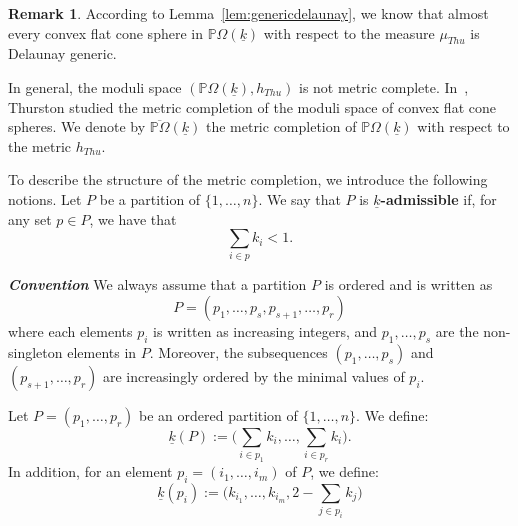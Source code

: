 \documentclass{compositio}
\numberwithin{equation}{section}
\numberwithin{figure}{section}
\theoremstyle{definition}
\newtheorem{remark}[definition]{Remark}
\theoremstyle{plain}
\begin{document}
{\begin{remark}
According to Lemma~\ref{lem:genericdelaunay}, we know that almost every convex flat cone sphere in $\mathbb{P}\Omega(\underline{k})$ with respect to the measure $\mu_{Thu}$ is Delaunay generic.
\end{remark}

In general, the moduli space $(\mathbb{P}\Omega(\underline{k}),h_{Thu})$ is not metric complete. In~\cite{thu}, Thurston studied the metric completion of the moduli space of convex flat cone spheres. We denote by $\overline{\mathbb{P}\Omega}(\underline{k})$ the metric completion of $\mathbb{P}\Omega(\underline{k})$ with respect to the metric $h_{Thu}$.


To describe the structure of the metric completion, we introduce the following notions. Let $P$ be a partition of $\{1,\ldots,n\}$. We say that $P$ is \textbf{$\underline{k}$-admissible} if, for any set $p \in P$, we have that
$$
\sum_{i\in p}k_i<1.
$$

\noindent\textit{\textbf{Convention}} We always assume that a partition $P$ is ordered and is written as 
$$P = (p_1, \ldots, p_s, p_{s+1},\ldots, p_r)$$ 
where each elements $p_i$ is written as increasing integers, and $p_1, \ldots, p_s$ are the non-singleton elements in $P$. Moreover, the subsequences $(p_1, \ldots, p_s)$ and $(p_{s+1}, \ldots, p_r)$ are increasingly ordered by the minimal values of $p_i$.\newline


Let $P = (p_1, \ldots, p_r)$ be an ordered partition of $\{1,\ldots,n\}$. We define:
\begin{equation}\label{equ:curvaturenotations0}
    \underline{k}(P) := \Big(\sum_{i \in p_1} k_i, \ldots, \sum_{i \in p_r} k_i \Big).
\end{equation}
In addition, for an element $p_i=(i_1,\ldots,i_m)$ of $P$, we define:
\begin{equation}\label{equ:curvaturenotations1}
    \underline{k}(p_i) := \Big(k_{i_1}, \ldots, k_{i_m}, 2 - \sum_{j \in p_i} k_j \Big)
\end{equation}

}
\end{document}
